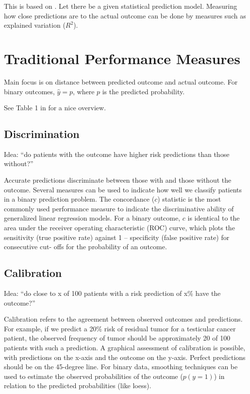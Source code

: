 \documentclass[12pt]{article}
\begin{document}
This is based on \cite{steyerberg2010}. Let there be a given statistical prediction model. Measuring how close predictions are to the actual outcome can be done by measures such as explained variation ($R^2$). 


\section{Traditional Performance Measures}
Main focus is on distance between predicted outcome and actual outcome. For binary outcomes, $\hat{y} = p$, where $p$ is the predicted probability. 

See Table 1 in \cite{steyerberg2010} for a nice overview.

\subsection{Discrimination}
Idea: ``do patients with the outcome have higher risk predictions than those without?''

Accurate predictions discriminate between those with and those without the outcome. Several measures can be used to indicate how well we classify patients in a binary prediction problem. The concordance ($c$) statistic is the most commonly used performance measure to indicate the discriminative ability of generalized linear regression models. For a binary outcome, $c$ is identical to the area under the receiver operating characteristic (ROC) curve, which plots the sensitivity (true positive rate) against 1 – specificity (false positive rate) for consecutive cut- offs for the probability of an outcome.

\subsection{Calibration}
Idea: ``do close to x of 100 patients
with a risk prediction of x\% have the outcome?''

Calibration refers to the agreement between observed outcomes and predictions. For example, if we predict a 20\% risk of residual tumor for a testicular cancer patient, the observed frequency of tumor should be approximately 20 of 100 patients with such a prediction. A graphical assessment of calibration is possible, with predictions on the x-axis and the outcome on the y-axis. Perfect predictions should be on the 45-degree line. For binary data, smoothing techniques can be used to estimate the observed probabilities of the outcome ($p(y=1)$) in relation to the predicted probabilities (like loess).





\end{document}
